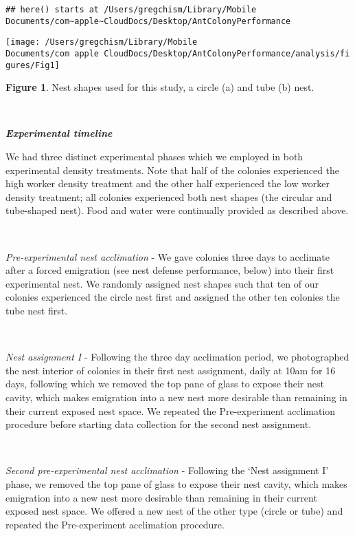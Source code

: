 \documentclass[3p]{elsarticle} %
\begin{document}
\begin{verbatim}
## here() starts at /Users/gregchism/Library/Mobile Documents/com~apple~CloudDocs/Desktop/AntColonyPerformance
\end{verbatim}

\begin{flushleft}\texttt{[image: /Users/gregchism/Library/Mobile Documents/com~apple~CloudDocs/Desktop/AntColonyPerformance/analysis/figures/Fig1]} \end{flushleft}

\textbf{Figure 1}. Nest shapes used for this study, a circle (a) and
tube (b) nest.

~

\textbf{\emph{Experimental timeline}}

We had three distinct experimental phases which we employed in both
experimental density treatments. Note that half of the colonies
experienced the high worker density treatment and the other half
experienced the low worker density treatment; all colonies experienced
both nest shapes (the circular and tube-shaped nest). Food and water
were continually provided as described above.

~

\emph{Pre-experimental nest acclimation} - We gave colonies three days
to acclimate after a forced emigration (see nest defense performance,
below) into their first experimental nest. We randomly assigned nest
shapes such that ten of our colonies experienced the circle nest first
and assigned the other ten colonies the tube nest first.

~

\emph{Nest assignment I} - Following the three day acclimation period,
we photographed the nest interior of colonies in their first nest
assignment, daily at 10am for 16 days, following which we removed the
top pane of glass to expose their nest cavity, which makes emigration
into a new nest more desirable than remaining in their current exposed
nest space. We repeated the Pre-experiment acclimation procedure before
starting data collection for the second nest assignment.

~

\emph{Second pre-experimental nest acclimation} - Following the `Nest
assignment I' phase, we removed the top pane of glass to expose their
nest cavity, which makes emigration into a new nest more desirable than
remaining in their current exposed nest space. We offered a new nest of
the other type (circle or tube) and repeated the Pre-experiment
acclimation procedure.
\end{document}
